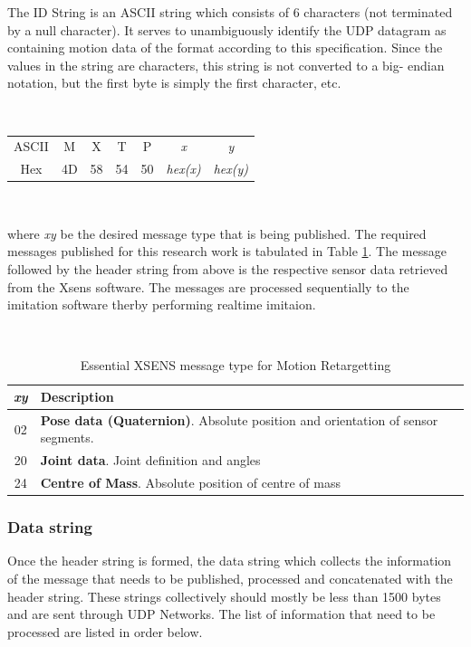 The ID String is an ASCII string which consists of 6 characters (not terminated by a null character). It serves to unambiguously identify the UDP datagram as containing motion data of the 
format according to this specification. Since the values in the string are characters, this string is not converted to a big- endian notation, but the first byte is simply the first character, etc.

~

\begin{tabular}{ccccccc}
    ASCII & M & X & T & P & \textit{x} & \textit{y} \\
    Hex & 4D & 58 & 54 & 50 & \textit{hex(x)} & \textit{hex(y)} \\
\end{tabular}

~

where \textit{xy} be the desired message type that is being published. The required messages published for this research work is tabulated in Table \ref{tab: xsens-message}. The message followed by the 
header string from above is the respective sensor data retrieved from the Xsens software. The messages are processed sequentially to the imitation software therby performing realtime imitaion.

~

\begin{table}[h!]
    \label{tab: xsens-message}
    \centering
    \begin{tabular}{|c|l|}
        \hline
        \textbf{\textit{xy}} & \textbf{Description} \\
        \hline
        02 & \textbf{Pose data (Quaternion)}. Absolute position and orientation of sensor segments. \\
        \hline 
        20 & \textbf{Joint data}. Joint definition and angles \\
        \hline
        24 & \textbf{Centre of Mass}. Absolute position of centre of mass \\
        \hline
    \end{tabular}
    \caption{Essential XSENS message type for Motion Retargetting}
\end{table}

\subsubsection{Data string}

Once the header string is formed, the data string which collects the information of the message that needs to be published, processed and concatenated with the header string. These strings collectively should 
mostly be less than 1500 bytes and are sent through UDP Networks. The list of information that need to be processed are listed in order below.

